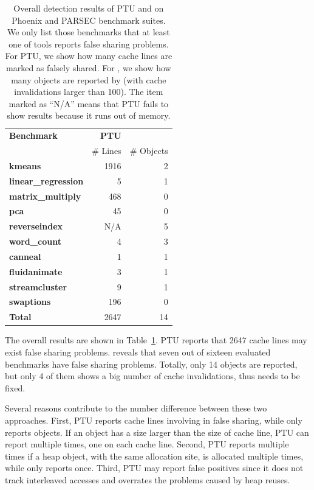 \begin{table}
\centering
\begin{tabular}{l|r|r}
\hline
{\bf \small Benchmark} & {\bf \small PTU} & {\bf \small \sheriffdetect{}}\\
 & {\# Lines} & {\# Objects}\\
\hline
\small \textbf{kmeans} & 1916 &  2 \\
\small \textbf{linear\_regression} & 5 & 1 \\
\small \textbf{matrix\_multiply} & 468 & 0\\
\small \textbf{pca} & 45 & 0 \\
\small \textbf{reverseindex} & N/A & 5 \\
\small \textbf{word\_count} & 4 & 3\\
\hline
\small \textbf{canneal} & 1 & 1 \\
\small \textbf{fluidanimate} & 3 & 1 \\
\small \textbf{streamcluster} & 9 & 1\\
\small \textbf{swaptions} & 196 & 0\\
\hline
\small \textbf{Total} & 2647 & 14\\
\hline
\end{tabular}
\caption{Overall detection results of PTU and \sheriffdetect{} on Phoenix and PARSEC benchmark suites. We only list those benchmarks that at least one of tools reports false sharing problems. For PTU, we show how many cache lines are marked as falsely shared. For \sheriffdetect{}, we show how many objects are reported by \sheriffdetect{} (with cache invalidations larger than 100). The item marked as ``N/A'' means that PTU fails to show results because it runs out of memory.
\label{table:fsdetection}}
\end{table}


The overall results are shown in Table~\ref{table:fsdetection}. PTU reports that 2647 cache lines may exist false sharing problems. \sheriffdetect{} reveals that seven out of sixteen evaluated benchmarks have false sharing problems. Totally, only 14 objects are reported, but only 4 of them shows a big number of cache invalidations, thus needs to be fixed. 

Several reasons contribute to the number difference between these two approaches. First, PTU reports cache lines involving in false sharing, while \SheriffDetect{} only reports objects. If an object has a size larger than the size of cache line, PTU can report multiple times, one on each cache line. Second, PTU reports multiple times if a heap object, with the same allocation site, is allocated multiple times, while \SheriffDetect{} only reports once. Third, PTU may report false positives since it does not track interleaved accesses and overrates the problems caused by heap reuses. 

